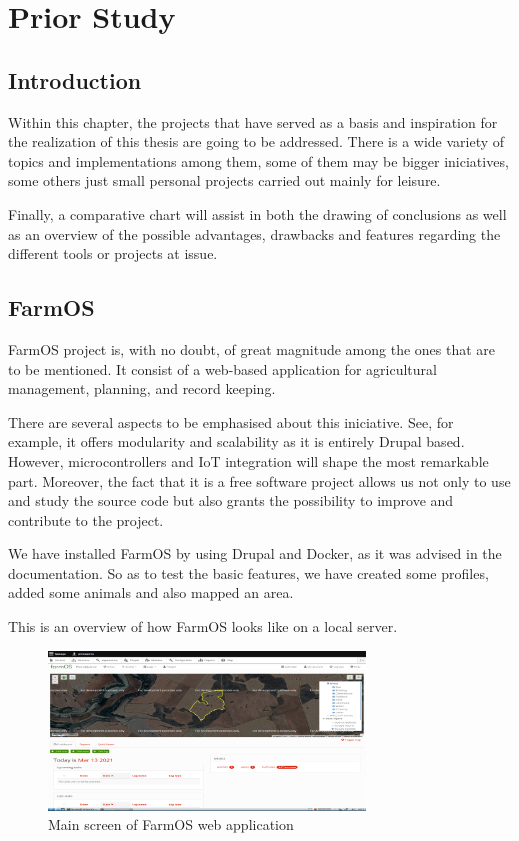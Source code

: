 \chapter{Prior Study}\label{cap:planificación}

\section{Introduction}
Within this chapter, the projects that have served as a basis and inspiration for the realization of this thesis are going to be addressed. There is a wide variety of topics and implementations among them, some of them may be bigger iniciatives, some others just small personal projects carried out mainly for leisure.

Finally, a comparative chart will assist in both the drawing of conclusions as well as an overview of the possible advantages, drawbacks and features regarding the different tools or projects at issue.

\section{FarmOS}
FarmOS project is, with no doubt, of great magnitude among the ones that are to be mentioned. It consist of a web-based application for agricultural management, planning, and record keeping.

There are several aspects to be emphasised about this iniciative. See, for example, it offers modularity and scalability as it is entirely Drupal based. However, microcontrollers and IoT integration will shape the most remarkable part. Moreover, the fact that it is a free software project allows us not only to use and study the source code but also grants the possibility to improve and contribute to the project.

We have installed FarmOS by using Drupal and Docker, as it was advised in the documentation. So as to test the basic features, we have created some profiles, added some animals and also mapped an area.

This is an overview of how FarmOS looks like on a local server.

\begin{figure}[htp]
    \centering
    \includegraphics[width=0.75\textwidth]{fig/tfg-farmos.png}
    \caption{Main screen of FarmOS web application}
    \label{fig:farmos}
\end{figure}

